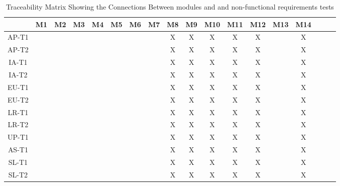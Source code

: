 \documentclass[12pt, oneside, openany, titlepage]{article}
\begin{document}
\begin{landscape}
\begin{table}[h!]
\centering
\begin{tabular}{|c|c|c|c|c|c|c|c|c|c|c|c|c|c|c|c|c|c|}
\hline
	& M1 & M2 & M3 & M4 & M5 & M6 & M7 & M8 & M9 & M10 & M11 & M12 & M13& M14\\
\hline
AP-T1        & & & & & & & & X& X& X& X& X& &X \\ \hline
AP-T2        & & & & & & & & X& X& X& X& X& &X \\ \hline
IA-T1        & & & & & & & & X& X& X& X& X& &X \\ \hline
IA-T2        & & & & & & & & X& X& X& X& X& &X \\ \hline
EU-T1        & & & & & & & & X& X& X& X& X& &X \\ \hline
EU-T2        & & & & & & & & X& X& X& X& X& &X \\ \hline
LR-T1        & & & & & & & & X& X& X& X& X& &X \\ \hline
LR-T2        & & & & & & & & X& X& X& X& X& &X \\ \hline
UP-T1        & & & & & & & & X& X& X& X& X& &X \\ \hline
AS-T1        & & & & & & & & X& X& X& X& X& &X \\ \hline
SL-T1        & & & & & & & & X& X& X& X& X& &X \\ \hline
SL-T2        & & & & & & & & X& X& X& X& X& &X \\ \hline
\end{tabular}
\caption{Traceability Matrix Showing the Connections Between modules and  and non-functional requirements tests}
\label{Table:A_trace}
\end{table}
\end{landscape}
\end{document}
